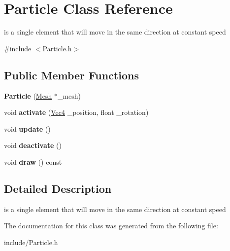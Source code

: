 \hypertarget{classParticle}{}\section{Particle Class Reference}
\label{classParticle}


is a single element that will move in the same direction at constant speed  




{\ttfamily \#include $<$Particle.\+h$>$}

\subsection*{Public Member Functions}
\begin{DoxyCompactItemize}
\item 
{\bfseries Particle} (\hyperlink{classMesh}{Mesh} $\ast$\+\_\+mesh)\hypertarget{classParticle_a5e3d06b6bef3954e12925c5afea900f6}{}\label{classParticle_a5e3d06b6bef3954e12925c5afea900f6}

\item 
void {\bfseries activate} (\hyperlink{classVec4}{Vec4} \+\_\+position, float \+\_\+rotation)\hypertarget{classParticle_a6cedea6d3a25699a50ff56d35dce6b6c}{}\label{classParticle_a6cedea6d3a25699a50ff56d35dce6b6c}

\item 
void {\bfseries update} ()\hypertarget{classParticle_a686aad22bf7a80a089e117bbc7f4b738}{}\label{classParticle_a686aad22bf7a80a089e117bbc7f4b738}

\item 
void {\bfseries deactivate} ()\hypertarget{classParticle_aaf1e8719527db4286c8154d43060b4e5}{}\label{classParticle_aaf1e8719527db4286c8154d43060b4e5}

\item 
void {\bfseries draw} () const \hypertarget{classParticle_a6a9c890bdf962bd4c0bec12c8765cc6c}{}\label{classParticle_a6a9c890bdf962bd4c0bec12c8765cc6c}

\end{DoxyCompactItemize}


\subsection{Detailed Description}
is a single element that will move in the same direction at constant speed 

The documentation for this class was generated from the following file\+:\begin{DoxyCompactItemize}
\item 
include/Particle.\+h\end{DoxyCompactItemize}
